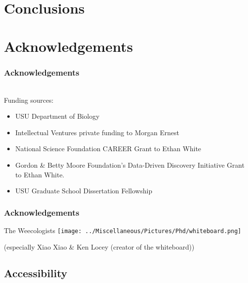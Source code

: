 \documentclass[14pt]{beamer}
\begin{document}
\section{Conclusions}

\section{Acknowledgements}
\begin{frame}[t]{}
\frametitle{Acknowledgements}
~\\ %
\small{Funding sources:}
\begin{tiny}
\begin{itemize}
\item USU Department of Biology
\item Intellectual Ventures private funding to Morgan Ernest
\item National Science Foundation CAREER Grant to Ethan White
\item Gordon \& Betty Moore Foundation's Data-Driven Discovery Initiative Grant to Ethan White.
\item USU Graduate School Dissertation Fellowship
\end{itemize}
\end{tiny}
\end{frame}

\begin{frame}{}
\frametitle{Acknowledgements}
The Weecologists
\texttt{[image: ../Miscellaneous/Pictures/Phd/whiteboard.png]}
\begin{tiny}
(especially Xiao Xiao \& Ken Locey (creator of the whiteboard))
\end{tiny}
\end{frame}

\subsection{Accessibility}
\begin{frame}{}

\end{frame}
\end{document}
